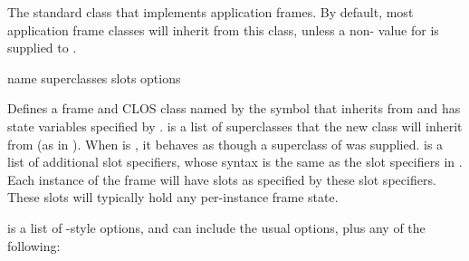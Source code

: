 
The standard class that implements application frames.  By default, most
application frame classes will inherit from this class, unless a non-
value for  is supplied to .


 {name superclasses slots \rest options}

Defines a frame and CLOS class named by the symbol  that inherits from
 and has state variables specified by .
 is a list of superclasses that the new class will inherit
from (as in ).  When  is , it behaves as
though a superclass of  was supplied.
 is a list of additional slot specifiers, whose syntax is the same as
the slot specifiers in .  Each instance of the frame will have
slots as specified by these slot specifiers.  These slots will typically hold
any per-instance frame state.

 is a list of -style options, and can include the
usual  options, plus any of the following:

